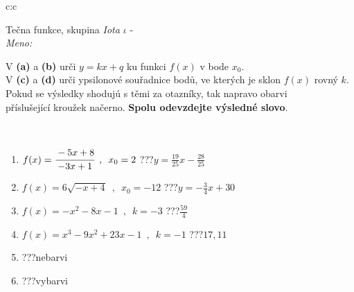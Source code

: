 \documentclass[10pt]{report}
\begin{document}
\newpage
\thispagestyle{empty}
\begin{tabular}{c:c}
\begin{minipage}[c][104.5mm][t]{0.5\linewidth}
\begin{center}
\vspace{7mm}
{\huge Tečna funkce, skupina \textit{Iota $\iota$} -}\\[5mm]
\textit{Meno:}\phantom{xxxxxxxxxxxxxxxxxxxxxxxxxxxxxxxxxxxxxxxxxxxxxxxxxxxxxxxxxxxxxxxxx}\\[5mm]
\begin{minipage}{0.95\linewidth}
\begin{center}
V \textbf{(a)} a \textbf{(b)} urči  $y = kx + q$ ku funkci $f(x)$ v bode $x_0$.\\V \textbf{(c)} a \textbf{(d)} urči ypsilonové souřadnice bodů, ve kterých je sklon $f(x)$ rovný $k$.\\Pokud se výsledky shodujú s těmi za otazníky, tak napravo obarvi\\příslušející kroužek načerno. \textbf{Spolu odevzdejte výsledné slovo}.
\end{center}
\end{minipage}
\\[1mm]
\begin{minipage}{0.79\linewidth}
\begin{center}
\begin{varwidth}{\linewidth}
\begin{enumerate}
\small
\item $f(x)=\cfrac{-5x+8}{-3x+1}\enspace , \enspace x_0=2$\quad \dotfill\; ???\;\dotfill \quad $y = \frac{19}{25}x-\frac{28}{25}$
\item $f(x)=6\sqrt{-x+4}\enspace , \enspace x_0=-12$\quad \dotfill\; ???\;\dotfill \quad $y = -\frac{3}{4}x+30$
\item $f(x)=-x^2-8x-1\enspace , \enspace k=-3$\quad \dotfill\; ???\;\dotfill \quad $\frac{59}{4}$
\item $f(x)=x^3-9x^2+23x-1\enspace , \enspace k=-1$\quad \dotfill\; ???\;\dotfill \quad $17 , 11$
\item \quad \dotfill\; ???\;\dotfill \quad nebarvi
\item \quad \dotfill\; ???\;\dotfill \quad vybarvi
\end{enumerate}
\end{varwidth}
\end{center}
\end{minipage}
\begin{minipage}{0.20\linewidth}

\end{minipage}
\end{center}
\end{minipage}
\end{tabular}
\end{document}
